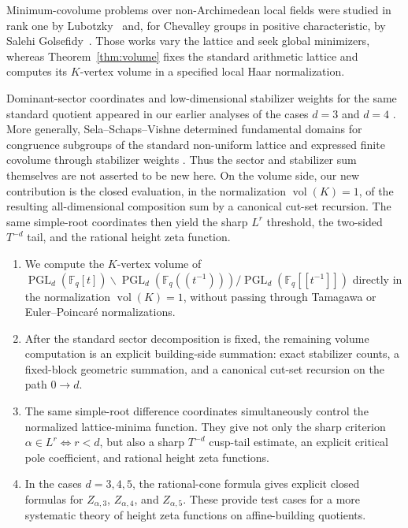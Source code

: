 \documentclass[11pt]{amsart}
\newcommand{\Fq}{\mathbb F_q}
\newcommand{\PGL}{\operatorname{PGL}}
\newcommand{\vol}{\operatorname{vol}}
\theoremstyle{plain}
\theoremstyle{definition}
\numberwithin{equation}{section}
\begin{document}
Minimum-covolume problems over non-Archimedean local fields were studied in rank one by
Lubotzky~\cite{LubotzkyMinimal} and, for Chevalley groups in positive characteristic, by
Salehi Golsefidy~\cite{SalehiGolsefidy,SalehiGolsefidyNonuniform}.  Those works vary the
lattice and seek global minimizers, whereas Theorem~\ref{thm:volume} fixes the standard
arithmetic lattice and computes its \(K\)-vertex volume in a specified local Haar
normalization.

Dominant-sector coordinates and low-dimensional stabilizer weights for the same
standard quotient appeared in our earlier analyses of the cases \(d=3\) and \(d=4\)
\cite{HongKwonPGL3,HongKwonPGL4}.  More generally, Sela--Schaps--Vishne determined
fundamental domains for congruence subgroups of the standard non-uniform lattice and
expressed finite covolume through stabilizer weights \cite{SelaSchapsVishne}.  Thus the
sector and stabilizer sum themselves are not asserted to be new here.  On the volume side,
our new contribution is the closed evaluation, in the normalization \(\vol(K)=1\), of the
resulting all-dimensional composition sum by a canonical cut-set recursion.  The same
simple-root coordinates then yield the sharp \(L^r\) threshold, the two-sided \(T^{-d}\)
tail, and the rational height zeta function.

\begin{enumerate}[label=(\roman*)]
\item We compute the $K$-vertex volume of
$\PGL_d(\Fq[t])\backslash\PGL_d(\Fq(\!(t^{-1})\!))/\PGL_d(\Fq[\![t^{-1}]\!])$ directly in the
normalization $\vol(K)=1$, without passing through Tamagawa or Euler--Poincar\'e
normalizations.
\item After the standard sector decomposition is fixed, the remaining volume
computation is an explicit building-side summation: exact stabilizer counts, a fixed-block
geometric summation, and a canonical cut-set recursion on the path \(0\to d\).
\item The same simple-root difference coordinates simultaneously control the normalized
lattice-minima function.  They give not only the sharp criterion
$\alpha\in L^r\Longleftrightarrow r<d$, but also a sharp $T^{-d}$ cusp-tail estimate, an
explicit critical pole coefficient, and rational height zeta functions.
\item In the cases \(d=3,4,5\), the rational-cone formula gives explicit closed
formulas for \(Z_{\alpha,3}\), \(Z_{\alpha,4}\), and \(Z_{\alpha,5}\).  These provide test
cases for a more systematic theory of height zeta functions on affine-building quotients.
\end{enumerate}
\end{document}
